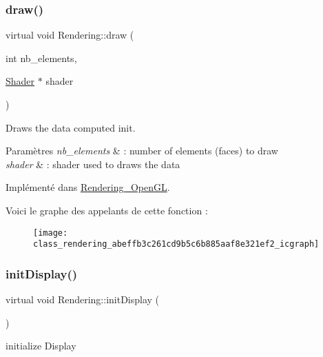\subsubsection{\texorpdfstring{draw()}{draw()}}
{\footnotesize\ttfamily virtual void Rendering\+::draw (\begin{DoxyParamCaption}\item[{int}]{nb\+\_\+elements,  }\item[{\hyperlink{class_shader}{Shader} $\ast$}]{shader }\end{DoxyParamCaption})\hspace{0.3cm}{\ttfamily [pure virtual]}}



Draws the data computed init. 


\begin{DoxyParams}{Paramètres}
{\em nb\+\_\+elements} & \+: number of elements (faces) to draw \\
\hline
{\em shader} & \+: shader used to draws the data \\
\hline
\end{DoxyParams}


Implémenté dans \hyperlink{class_rendering___open_g_l_a94abb636d4264637628e4b9b97c087d2}{Rendering\+\_\+\+Open\+GL}.

Voici le graphe des appelants de cette fonction \+:\nopagebreak
\begin{figure}[H]
\begin{center}
\leavevmode
\texttt{[image: class\_rendering\_abeffb3c261cd9b5c6b885aaf8e321ef2\_icgraph]}
\end{center}
\end{figure}
\mbox{\label{class_rendering_ae3ad4a7f4c5559cb258d72886123c3e0}} 
\subsubsection{\texorpdfstring{init\+Display()}{initDisplay()}}
{\footnotesize\ttfamily virtual void Rendering\+::init\+Display (\begin{DoxyParamCaption}{ }\end{DoxyParamCaption})\hspace{0.3cm}{\ttfamily [pure virtual]}}



initialize Display 



